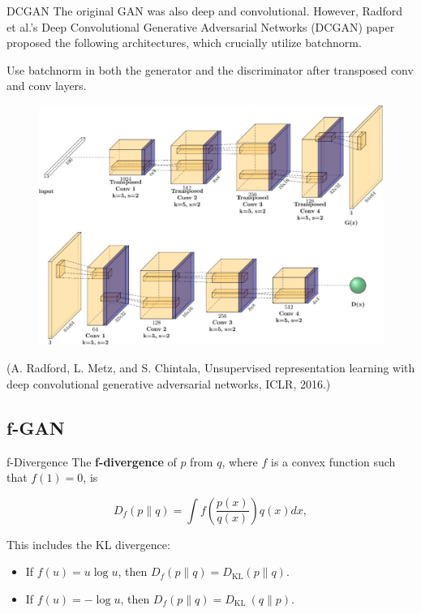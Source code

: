 \begin{frame}[allowframebreaks]

\begin{mydefinitionblock}{12.14}{DCGAN}
    The original GAN was also deep and convolutional.
    However, Radford et al.'s Deep Convolutional Generative Adversarial Networks (DCGAN) paper proposed the following architectures, which crucially utilize batchnorm.

    Use batchnorm in both the generator and the discriminator after transposed conv and conv layers.

    \begin{figure}[H]
        \centering
        \includegraphics[width=1.0\textwidth]{.././assets/12.3.png}
    \end{figure}

    (A. Radford, L. Metz, and S. Chintala, Unsupervised representation learning with deep convolutional generative adversarial networks, ICLR, 2016.)
\end{mydefinitionblock}

\end{frame}

\subsection{f-GAN}

\begin{frame}[allowframebreaks]

\begin{mydefinitionblock}{12.15}{f-Divergence}
    The \textbf{f-divergence} of $p$ from $q$, where $f$ is a convex function such that $f(1)=0$, is

    $$
    D_{f}(p \| q)=\int f\left(\frac{p(x)}{q(x)}\right) q(x) d x,
    $$

    This includes the KL divergence:

    \begin{itemize}
        \item If $f(u)=u \log u$, then $D_{f}(p \| q)=D_{\mathrm{KL}}(p \| q)$.
        \item If $f(u)=-\log u$, then $D_{f}(p \| q)=D_{\text {KL }}(q \| p)$.
    \end{itemize}
\end{mydefinitionblock}

\end{frame}

